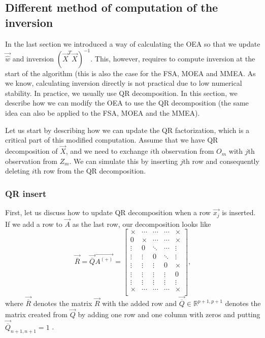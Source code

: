 

\subsection{Different method of computation of the inversion} \label{differentcomputation}
In the last section we introduced a way of calculating the OEA so that we update $\vec{\hat{w}}$ and inversion $(\vec{X}^T \vec{X})^{-1}$. This, however, requires to compute inversion at the start of the algorithm (this is also the case for the FSA, MOEA and MMEA. As we know, calculating inversion directly is not practical due to low numerical stability. In practice, we usually use QR decomposition. In this section, we describe how we can modify the OEA to use the QR decomposition (the same idea can also be applied to the FSA, MOEA and the MMEA). 

Let us start by describing how we can update the QR factorization, which is a critical part of this modified computation. Assume that we have QR decomposition of $\vec{X}$, and we need to exchange $i$th observation from $O_m$ with $j$th observation from $Z_m$. We can simulate this by inserting $j$th row and consequently deleting $i$th row from the QR decomposition. 



\subsubsection*{QR insert} 
First, let us discuss how to update QR decomposition when a row $\vec{x_j}$ is inserted. 
If we add a row to $\vec{A}$ as the last row, our decomposition looks like
\begin{equation}
    \vec{\overline{R}} =  \vec{\overline{Q}} \vec{A^{(+)}}  = 
    \begin{bmatrix}
        \times & \cdots & \cdots & \cdots & \times \\
        0 &\times & \cdots & \cdots & \times \\
        \vdots& 0&\ddots & \cdots & \vdots \\
        \vdots& \vdots&0 & \ddots &  \vdots \\
        \vdots& \vdots& \vdots& 0& \times \\
        \vdots& \vdots& \vdots& \vdots& 0  \\
        \vdots& \vdots& \vdots& \vdots& \vdots \\
        \times & \cdots & \cdots & \cdots & \times \\
    \end{bmatrix},
\end{equation}
where $\vec{\overline{R}}$ denotes the matrix $\vec{R}$ with the added row and $\vec{\overline{Q}} \in \mathbb{R}^{p+1, p+1}$ denotes the matrix created from $\vec{Q}$ by adding one row and one column with zeros and putting $\vec{\overline{Q}}_{n+1,n+1} = 1$ . 

